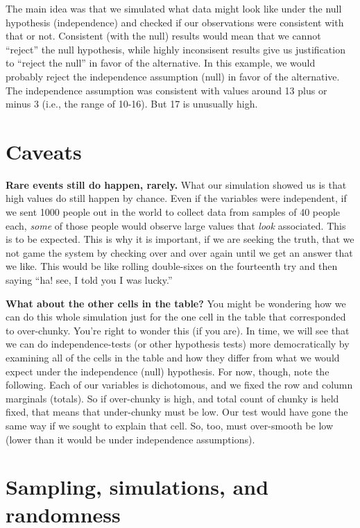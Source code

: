 \documentclass[
  openany]{book}
\begin{document}
The main idea was that we simulated what data might look like under the null hypothesis (independence) and checked if our observations were consistent with that or not. Consistent (with the null) results would mean that we cannot ``reject'' the null hypothesis, while highly inconsisent results give us justification to ``reject the null'' in favor of the alternative. In this example, we would probably reject the independence assumption (null) in favor of the alternative. The independence assumption was consistent with values around 13 plus or minus 3 (i.e., the range of 10-16). But 17 is unusually high.

\hypertarget{caveats}{%
\section*{Caveats}\label{caveats}}

\textbf{Rare events still do happen, rarely.} What our simulation showed us is that high values do still happen by chance. Even if the variables were independent, if we sent 1000 people out in the world to collect data from samples of 40 people each, \emph{some} of those people would observe large values that \emph{look} associated. This is to be expected. This is why it is important, if we are seeking the truth, that we not game the system by checking over and over again until we get an answer that we like. This would be like rolling double-sixes on the fourteenth try and then saying ``ha! see, I told you I was lucky.''

\textbf{What about the other cells in the table?} You might be wondering how we can do this whole simulation just for the one cell in the table that corresponded to over-chunky. You're right to wonder this (if you are). In time, we will see that we can do independence-tests (or other hypothesis tests) more democratically by examining all of the cells in the table and how they differ from what we would expect under the independence (null) hypothesis. For now, though, note the following. Each of our variables is dichotomous, and we fixed the row and column marginals (totals). So if over-chunky is high, and total count of chunky is held fixed, that means that under-chunky must be low. Our test would have gone the same way if we sought to explain that cell. So, too, must over-smooth be low (lower than it would be under independence assumptions).

\hypertarget{sampling-simulations-and-randomness}{%
\section*{Sampling, simulations, and randomness}\label{sampling-simulations-and-randomness}}
\end{document}
